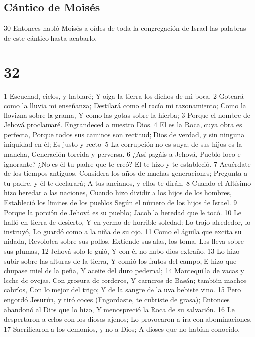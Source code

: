 \section{Cántico de Moisés}

30 Entonces habló Moisés a oídos de toda la congregación de Israel las palabras de este cántico hasta acabarlo.

\chapter{32}


1 Escuchad, cielos, y hablaré;
Y oiga la tierra los dichos de mi boca. 
2   Goteará como la lluvia mi enseñanza; 
Destilará como el rocío mi razonamiento;
Como la llovizna sobre la grama,
Y como las gotas sobre la hierba;
3    Porque el nombre de Jehová proclamaré.
Engrandeced a nuestro Dios.
4    El es la Roca, cuya obra es perfecta,
Porque todos sus caminos son rectitud;
Dios de verdad, y sin ninguna iniquidad en él;
Es justo y recto.
5    La corrupción no es suya; de sus hijos es la mancha,
Generación torcida y perversa.
6     ¿Así pagáis a Jehová,
Pueblo loco e ignorante?
¿No es él tu padre que te creó?
El te hizo y te estableció.
7    Acuérdate de los tiempos antiguos,
Considera los años de muchas generaciones;
Pregunta a tu padre, y él te declarará;
A tus ancianos, y ellos te dirán. 
8   Cuando el Altísimo hizo heredar a las naciones,
Cuando hizo dividir a los hijos de los hombres,
Estableció los límites de los pueblos
Según el número de los hijos de Israel.
9   Porque la porción de Jehová es su pueblo;
 Jacob la heredad que le tocó.
10 Le halló en tierra de desierto,
Y en yermo de horrible soledad;
Lo trajo alrededor, lo instruyó,
Lo guardó como a la niña de su ojo.
11 Como el águila que excita su nidada,
Revolotea sobre sus pollos,
Extiende sus alas, los toma,
Los lleva sobre sus plumas, 
12 Jehová solo le guió,
Y con él no hubo dios extraño.
13 Lo hizo subir sobre las alturas de la tierra,
Y comió los frutos del campo,
E hizo que chupase miel de la peña,
Y aceite del duro pedernal;
14 Mantequilla de vacas y leche de ovejas,
Con grosura de corderos, 
Y carneros de Basán; también machos cabríos,
Con lo mejor del trigo;
Y de la sangre de la uva bebiste vino.
15 Pero engordó Jesurún, y tiró coces
(Engordaste, te cubriste de grasa);
Entonces abandonó al Dios que lo hizo,
Y menospreció la Roca de su salvación. 
16 Le despertaron a celos con los dioses ajenos;
Lo provocaron a ira con abominaciones. 
17 Sacrificaron a los demonios, y no a Dios; 
A dioses que no habían conocido,
